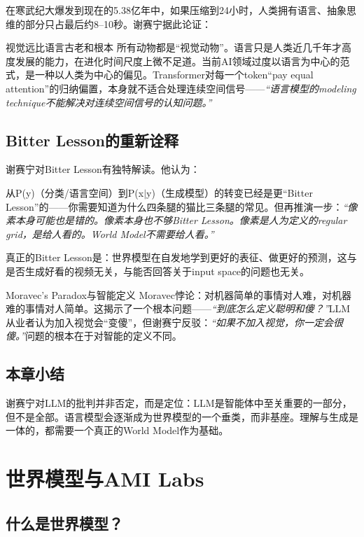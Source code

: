 \documentclass[a4paper]{article}
\begin{document}
在寒武纪大爆发到现在的5.38亿年中，如果压缩到24小时，人类拥有语言、抽象思维的部分只占最后约8--10秒。谢赛宁据此论证：

\begin{importantbox}{视觉远比语言古老和根本}
所有动物都是``视觉动物''。语言只是人类近几千年才高度发展的能力，在进化时间尺度上微不足道。当前AI领域过度以语言为中心的范式，是一种以人类为中心的偏见。Transformer对每一个token``pay equal attention''的归纳偏置，本身就不适合处理连续空间信号——\textit{``语言模型的modeling technique不能解决对连续空间信号的认知问题。''}
\end{importantbox}

\subsection{Bitter Lesson的重新诠释}

谢赛宁对Bitter Lesson有独特解读。他认为：

从P(y)（分类/语言空间）到P(x$|$y)（生成模型）的转变已经是更``Bitter Lesson''的——你需要知道为什么四条腿的猫比三条腿的常见。但再推演一步：\textit{``像素本身可能也是错的。像素本身也不够Bitter Lesson。像素是人为定义的regular grid，是给人看的。World Model不需要给人看。''}

真正的Bitter Lesson是：世界模型在自发地学到更好的表征、做更好的预测，这与是否生成好看的视频无关，与能否回答关于input space的问题也无关。

\begin{importantbox}{Moravec's Paradox与智能定义}
Moravec悖论：对机器简单的事情对人难，对机器难的事情对人简单。这揭示了一个根本问题——\textit{``到底怎么定义聪明和傻？''}LLM从业者认为加入视觉会``变傻''，但谢赛宁反驳：\textit{``如果不加入视觉，你一定会很傻。''}问题的根本在于对智能的定义不同。
\end{importantbox}

\subsection{本章小结}

谢赛宁对LLM的批判并非否定，而是定位：LLM是智能体中至关重要的一部分，但不是全部。语言模型会逐渐成为世界模型的一个垂类，而非基座。理解与生成是一体的，都需要一个真正的World Model作为基础。

\section{世界模型与AMI Labs}

\subsection{什么是世界模型？}
\end{document}
